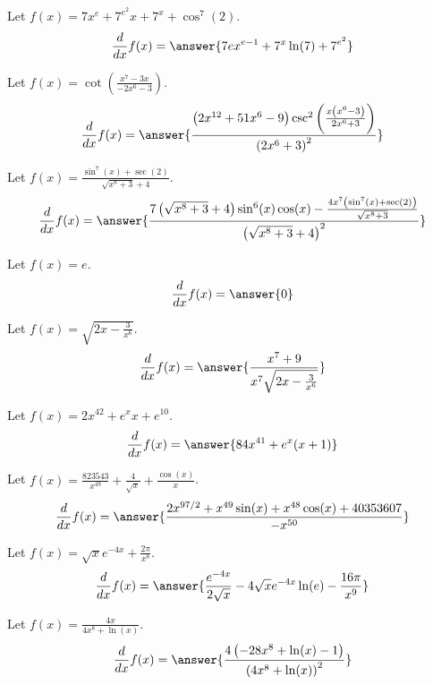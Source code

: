 \documentclass{ximera}
\begin{document}
\begin{shuffle}
\begin{exercise}
Let $f(x)=7 x^e+7^{e^2} x+7^x+\cos ^7(2)$.
\[
\ddx f(x) = \answer{7 e x^{e-1}+7^x \ln (7)+7^{e^2}}
\]
\end{exercise}

\begin{exercise}
Let $f(x)=\cot \left(\frac{x^7-3 x}{-2 x^6-3}\right)$.
\[
\ddx f(x) = \answer{\frac{\left(2 x^{12}+51 x^6-9\right) \csc ^2\left(\frac{x \left(x^6-3\right)}{2 x^6+3}\right)}{\left(2 x^6+3\right)^2}}
\]
\end{exercise}

\begin{exercise}
Let $f(x)=\frac{\sin ^7(x)+\sec (2)}{\sqrt{x^8+3}+4}$.
\[
\ddx f(x) = \answer{\frac{7 \left(\sqrt{x^8+3}+4\right) \sin ^6(x) \cos (x)-\frac{4 x^7 \left(\sin ^7(x)+\sec (2)\right)}{\sqrt{x^8+3}}}{\left(\sqrt{x^8+3}+4\right)^2}}
\]
\end{exercise}

\begin{exercise}
\begin{exercise}
Let $f(x)=e$.
\[
\ddx f(x) = \answer{0}
\]
\end{exercise}

\begin{exercise}
Let $f(x)=\sqrt{2 x-\frac{3}{x^6}}$.
\[
\ddx f(x) = \answer{\frac{x^7+9}{x^7 \sqrt{2 x-\frac{3}{x^6}}}}
\]
\end{exercise}

\begin{exercise}
Let $f(x)=2 x^{42}+e^x x+e^{10}$.
\[
\ddx f(x) = \answer{84 x^{41}+e^x (x+1)}
\]
\end{exercise}

\begin{exercise}
Let $f(x)=\frac{823543}{x^{49}}+\frac{4}{\sqrt{x}}+\frac{\cos (x)}{x}$.
\[
\ddx f(x) = \answer{\frac{2 x^{97/2}+x^{49} \sin (x)+x^{48} \cos (x)+40353607}{-x^{50}}}
\]
\end{exercise}

\begin{exercise}
Let $f(x)=\sqrt{x} e^{-4 x}+\frac{2 \pi }{x^8}$.
\[
\ddx f(x) = \answer{\frac{e^{-4 x}}{2 \sqrt{x}}-4 \sqrt{x} e^{-4 x} \ln (e)-\frac{16 \pi }{x^9}}
\]
\end{exercise}

\begin{exercise}
Let $f(x)=\frac{4 x}{4 x^8+\ln (x)}$.
\[
\ddx f(x) = \answer{\frac{4 \left(-28 x^8+\ln (x)-1\right)}{\left(4 x^8+\ln (x)\right)^2}}
\]
\end{exercise}


\end{exercise}
\end{shuffle}
\end{document}
